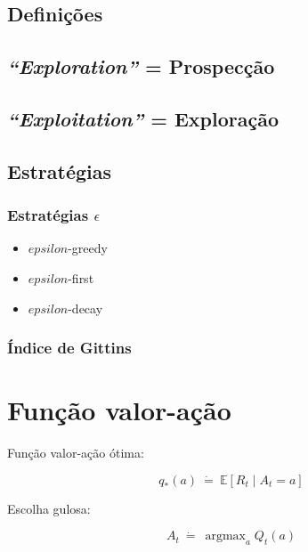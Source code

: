 \documentclass{article}
\DeclareMathOperator*{\argmax}{argmax}
\begin{document}
    \subsection{Definições}
    
        \subsection{\textit{``Exploration''} = Prospecção}
        
        \subsection{\textit{``Exploitation''} = Exploração}
    
    \subsection{Estratégias}
    
        \subsubsection{Estratégias $\epsilon$}
        
            \begin{itemize}
                \item $epsilon$-greedy
                \item $epsilon$-first
                \item $epsilon$-decay
            \end{itemize}
        
        \subsubsection{Índice de Gittins}

\section{Função valor-ação}

    Função valor-ação ótima:

    \begin{equation}
        q_*(a) \ \dot{=} \ \mathbb{E}[R_t \mid A_t = a]
    \end{equation}

    Escolha gulosa:

    \begin{equation}
        A_t \ \dot{=} \ \argmax_a Q_t(a)
    \end{equation}
    
\end{document}
